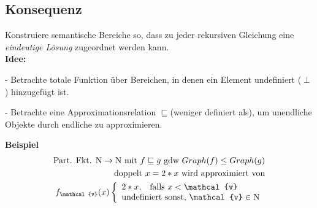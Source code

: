 \subsection{Konsequenz}
Konstruiere semantische Bereiche so, dass zu jeder rekursiven Gleichung eine \emph{eindeutige Lösung} zugeordnet werden kann.\\
\textbf{Idee:} 
\begin{compactitem}
	\item[-] Betrachte totale Funktion über Bereichen, in denen ein Element undefiniert ($\perp$) hinzugefügt ist.
	\item[-] Betrachte eine Approximationsrelation $\sqsubseteq$(weniger definiert als), um unendliche Objekte durch endliche zu approximieren.
	\item[\textbf{Beispiel}]
	\begin{align*}
		\text{Part. Fkt. } \mathrm{N}\rightarrow \mathrm{N}\text{ mit } f \sqsubseteq g \text{ gdw } Graph(f) \leq Graph(g)\\
		\text{doppelt } x = 2 * x \text{ wird approximiert von}\\
		f_{\mathcal{v}}(x)
		\left\lbrace\begin{array}{l l}
		2*x\text{,} \quad\text{falls } x<\mathcal{v}\\
		\text{undefiniert sonst, } \mathcal{v} \in \mathrm{N}\\ 
		\end{array}\right.\\
	\end{align*}
\end{compactitem}
